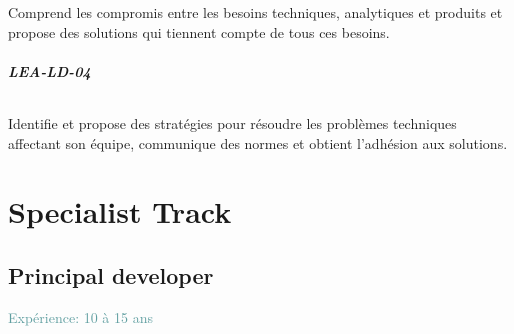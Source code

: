 \documentclass[a4paper, french, openany, 12pt]{book}
\newcommand\cha[1]{\textcolor{OliveGreen}{\textbf{\uppercase{lea-{#1}}}}}
\newcommand\xp[1]{\textcolor{CadetBlue}{Expérience: {#1} ans}}
\begin{document}
\begin{multicols}{2}
  Comprend les compromis entre les besoins techniques, analytiques et produits et propose des solutions qui tiennent 
  compte de tous ces besoins.

  \paragraph*{\cha{ld-04}}

  Identifie et propose des stratégies pour résoudre les problèmes techniques affectant son équipe, communique des normes 
  et obtient l'adhésion aux solutions.

\end{multicols}

\part{Specialist Track}

\chapter{Principal developer}

\xp{10 à 15}
\end{document}
